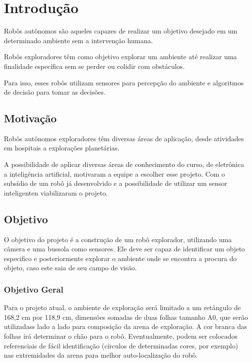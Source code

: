 \chapter{Introdução}

Robôs autônomos são aqueles capazes de realizar um objetivo desejado em um determinado ambiente sem a intervenção humana.

Robôs exploradores têm como objetivo explorar um ambiente até realizar uma finalidade específica sem se perder ou colidir com obstáculos.

Para isso, esses robôs utilizam sensores para percepção do ambiente e algoritmos de decisão para tomar as decisões.

\section{Motivação}

Robôs autônomos exploradores têm diversas áreas de aplicação, desde atividades em hospitais a explorações planetárias. 

A possibilidade de aplicar diversas áreas de conhecimento do curso, de eletrônica a inteligência artificial, motivaram a equipe a escolher esse projeto. Com o subsídio de um robô já desenvolvido e a possibilidade de utilizar um sensor inteligenten viabilizaram o projeto.

\section{Objetivo}

O objetivo do projeto é a construção de um robô explorador, utilizando uma câmera e uma bussola como sensores. Ele deve ser capaz de identificar um objeto especifico e posteriormente explorar o ambiente onde se encontra a procura do objeto, caso este saia de seu campo de visão.

\subsection{Objetivo Geral}

Para o projeto atual, o ambiente de exploração será limitado a um retângulo de 168,2 cm por 118,9 cm, dimensões somadas de duas folhas tamanho A0, que serão utilizadass lado a lado para composição da arena de exploração. A cor branca das folhas irá determinar o chão para o robô. Eventualmente, podem ser colocados referenciais de fácil identificação (círculos de determinadas cores, por exemplo) nas extremidades da arena para melhor auto-localização do robô.


